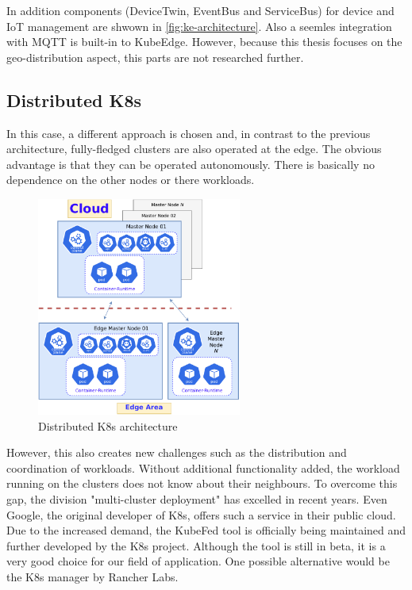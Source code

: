 \documentclass[MSC,Master,english]{twbook}%
\begin{document}
In addition components (DeviceTwin, EventBus and ServiceBus) for device and \ac{IoT} management are shwown in \autoref{fig:ke-architecture}. Also a seemles integration with \ac{MQTT} is built-in to KubeEdge\cite{hal-kubeedge}. However, because this thesis focuses on the geo-distribution aspect, this parts are not researched further.


\subsection{Distributed K8s}
\label{sec:disk8s}
In this case, a different approach is chosen and, in contrast to the previous architecture, fully-fledged clusters are also operated at the edge. The obvious advantage is that they can be operated autonomously. There is basically no dependence on the other nodes or there workloads.

\begin{figure}[ht]
    \centering
    \includegraphics[width=0.60\textwidth]{PICs/drawio/distributed-k8s.drawio.pdf}
    \caption{Distributed \ac{K8s} architecture}
    \label{fig:distributed-k8s}
\end{figure}

However, this also creates new challenges such as the distribution and coordination of workloads. Without additional functionality added, the workload running on the clusters does not know about their neighbours. To overcome this gap, the division "multi-cluster deployment" has excelled in recent years. Even Google, the original developer of \ac{K8s}, offers such a service \cite{google-mcs} in their public cloud. Due to the increased demand, the \ac{KubeFed} tool is officially being maintained and further developed by the \ac{K8s} project\cite{kubefed-github}. Although the tool is still in beta, it is a very good choice for our field of application. One possible alternative would be the \ac{K8s} manager by Rancher Labs.
\end{document}
